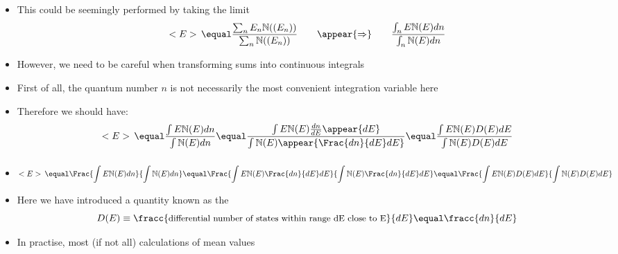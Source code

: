\begin{frame}
\frametitle{\texorpdfstring{\culine[\sectiontitleulinecolor]{\sectiontitle}}{\sectiontitle} }

\begin{itemize}
	\item This could be seemingly performed by taking the limit
\[ 
  < E >\,  \equal \frac{\sum_{n} E_{n} \mathbb{N} \textrm{((} E_{n} \textrm{))} }{\sum_{n} \mathbb{N} \textrm{((} E_{n} \textrm{))} } \qquad \appear{\Rightarrow} \qquad \frac{\int_{n} E \mathbb{N}(E) d n}{\int_{n} \mathbb{N}(E) d n} 
 \]
	\item However, we need to be careful when transforming sums into continuous integrals
	
\item First of all, the quantum number $n$ is not necessarily the most convenient integration variable here

\item Therefore we should have:
\[ 
  < E >\,  \equal \frac{\int E \mathbb{N}(E) d n}{\int \mathbb{N}(E) d n} \equal \frac{\int E \mathbb{N}(E) \frac{d n}{d E} \appear{d E}}{\int \mathbb{N}(E) \appear{\Frac{d n}{d E} d E}} \equal \frac{\int E \mathbb{N}(E) D(E) d E}{\int \mathbb{N}(E) D(E) d E} 
 \]

\end{itemize}

\endofslide 
\end{frame}

\begin{frame}
\frametitle{\texorpdfstring{\culine[\sectiontitleulinecolor]{\sectiontitle}}{\sectiontitle} }

\begin{itemize}
\item[] %
\[ 
  < E >\,  \equal \Frac{\int E \mathbb{N}(E) d n}{\int \mathbb{N}(E) d n}  \equal \Frac{\int E \mathbb{N}(E) \Frac{d n}{d E} d E}{\int \mathbb{N}(E) \Frac{d n}{d E} d E} \equal \Frac{\int E \mathbb{N}(E) D(E) d E}{\int \mathbb{N}(E) D(E) d E} 
 \]
\item Here we have introduced a quantity known as the  
\[ 
 D(E) \equiv \fracc{\text{\small differential number of states within range dE close to E}}{d E} \equal \fracc{d n}{d E} 
 \]

\item In practise, most (if not all) calculations of mean values 
\end{itemize}

\endofslide 
\end{frame}


